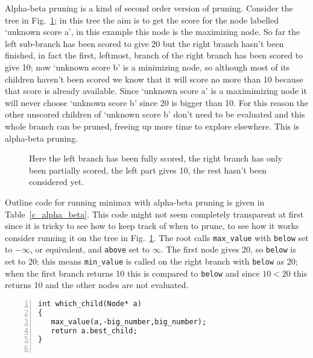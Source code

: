 \documentclass[11pt,a4paper]{scrartcl}
\begin{document}
{Alpha-beta pruning is a kind of second order version of
pruning. Consider the tree in Fig.~\ref{fig:partial}; in this tree the
aim is to get the score for the node labelled \lq{}unknown score
a\rq{}, in this example this node is the maximizing node. So far the
left sub-branch has been scored to give 20 but the right branch hasn't
been finished, in fact the first, leftmost, branch of the right branch
has been scored to give 10; now \lq{}unknown score b\rq{} is a
minimizing node, so although most of its children haven't been scored
we know that it will score no more than 10 because that score is
already available. Since \lq{}unknown score a\rq{} is a maximimizing
node it will never choose \lq{}unknown score b\rq{} since 20 is bigger
than 10. For this reason the other unscored children of \lq{}unknown
score b\rq{} don't need to be evaluated and this whole branch can be
pruned, freeing up more time to explore elsewhere. This is alpha-beta
pruning.

\begin{figure}
\begin{center}
\end{center}
\caption{Here the left branch has been fully scored, the right branch has only been partially scored, the left part gives 10, the rest hasn't been considered yet.\label{fig:partial}}
\end{figure}

Outline code for running minimax with alpha-beta pruning is given in
Table~\ref{c_alpha_beta}. This code might not seem completely
transparent at first since it is tricky to see how to keep track of
when to prune, to see how it works consider running it on the tree in
Fig.~\ref{fig:partial}. The root calls \texttt{max\_value} with
\texttt{below} set to $-\infty$, or equivalent, and \texttt{above} set
to $\infty$. The first node gives 20, so \texttt{below} is set to 20;
this means \texttt{min\_value} is called on the right branch with
\texttt{below} as 20; when the first branch returns 10 this is
compared to \texttt{below} and since $10<20$ this returns 10 and the
other nodes are not evaluated.

   
\begin{table}
\begin{lstlisting}[numbers=left]
int which_child(Node* a)
{
   max_value(a,-big_number,big_number);
   return a.best_child;
}


\end{lstlisting}
\end{table}}
\end{document}
